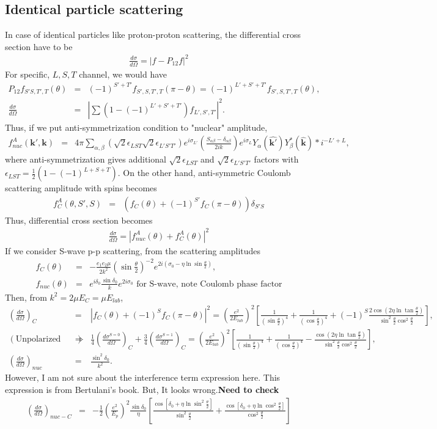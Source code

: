 \documentclass[10pt]{article}
\def\bm{\boldsymbol}
\newcommand{\bea}{\begin{eqnarray}}
\newcommand{\eea}{\end{eqnarray}}
\newcommand{\no}{\nonumber \\}
\def\vk{{\bm k}}
\begin{document}
\subsection{Identical particle scattering}
In case of identical particles like proton-proton scattering,
the differential cross section have to be 
\bea 
\frac{d\sigma}{d\Omega}=| f-P_{12}f |^2
\eea 
For specific, $L,S,T$ channel, we would have 
\bea 
P_{12}f_{S'S,T',T}(\theta)&=&(-1)^{S'+T'}f_{S',S,T',T}(\pi-\theta)
                           =(-1)^{L'+S'+T'}f_{S',S,T',T}(\theta),\no 
\frac{d\sigma}{d\Omega}
  &=& |\sum (1-(-1)^{L'+S'+T'}) f_{L',S',T'}|^2.
\eea 
Thus, if we put anti-symmetrization condition to "nuclear" amplitude,
\bea 
f^A_{nuc}(\vk',\vk)&=&4\pi\sum_{\alpha,\beta}
       \left(\sqrt{2}\epsilon_{LST} \sqrt{2}\epsilon_{L'S'T'}\right) 
       e^{i\sigma_{L'}}\left(\frac{S_{\alpha\beta}-\delta_{\alpha\beta}}{2ik}\right) e^{i\sigma_{L}}  
       Y_\alpha(\hat{\vk'})Y_\beta^*(\hat{\vk}) *i^{-L'+L}, 
\eea 
where anti-symmetrization gives additional $\sqrt{2}\epsilon_{LST}$
and $\sqrt{2}\epsilon_{L'S'T'}$ factors with $\epsilon_{LST}=\frac{1}{2}(1-(-1)^{L+S+T})$.
On the other hand, anti-symmetric Coulomb scattering amplitude with spins becomes
\bea
f_C^{A}(\theta,S',S)&=&\left(f_C(\theta)+(-1)^{S'}f_C(\pi-\theta)\right)\delta_{S'S}
\eea 
Thus, differential cross section becomes
\bea 
\frac{d\sigma}{d\Omega}=|f^A_{nuc}(\theta)+f^A_C(\theta)|^2
\eea 
If we consider S-wave p-p scattering,
from the scattering amplitudes
\bea 
f_C(\theta)
&=&-\frac{e_1e_2\mu}{2k^2}
 \left(\sin\frac{\theta}{2}\right)^{-2}
 e^{2i(\sigma_0-\eta\ln\sin\frac{\theta}{2})}, \no 
f_{nuc}(\theta)
&=& e^{i\delta_0}\frac{\sin\delta_0}{k}e^{2i\sigma_0}  \mbox{ for S-wave, note Coulomb phase factor}
\eea 
Then, from $k^2=2\mu E_C=\mu E_{lab}$,
\bea 
\left(\frac{d\sigma}{d\Omega}\right)_C
&=&|f_C(\theta)+(-1)^S f_C(\pi-\theta)|^2
=\left( \frac{e^2}{2E_{lab}}\right)^2\left[ 
 \frac{1}{(\sin\frac{\theta}{2})^4}+\frac{1}{(\cos\frac{\theta}{2})^4}
          +(-1)^S\frac{2\cos(2\eta\ln\tan\frac{\theta}{2})}{\sin^2\frac{\theta}{2} \cos^2\frac{\theta}{2}}
\right],\no 
(\mbox{Unpolarized case})&\Rightarrow& \frac{1}{4}\left(\frac{d\sigma^{S=0}}{d\Omega}\right)_C
             +\frac{3}{4}\left(\frac{d\sigma^{S=1}}{d\Omega}\right)_C
          =\left( \frac{e^2}{2E_{lab}}\right)^2\left[ 
           \frac{1}{(\sin\frac{\theta}{2})^4}+\frac{1}{(\cos\frac{\theta}{2})^4}
                    -\frac{\cos(2\eta\ln\tan\frac{\theta}{2})}{\sin^2\frac{\theta}{2} \cos^2\frac{\theta}{2}}
          \right],\no   
\left(\frac{d\sigma}{d\Omega}\right)_{nuc}&=& \frac{\sin^2\delta_0}{k^2}.
\eea 
However, I am not sure about the interference term expression here. This expression is 
from Bertulani's book. But, It looks wrong.{\bf  Need to check}
\bea 
\left(\frac{d\sigma}{d\Omega}\right)_{nuc-C}
&=& -\frac{1}{2}(\frac{e^2}{E_p})^2\frac{\sin\delta_0}{\eta}
    \left[\frac{\cos[\delta_0+\eta\ln\sin^2\frac{\theta}{2}]}{\sin^2\frac{\theta}{2}}
         +\frac{\cos[\delta_0+\eta\ln\cos^2\frac{\theta}{2}]}{\cos^2\frac{\theta}{2}}
    \right]
\eea 
\end{document}
